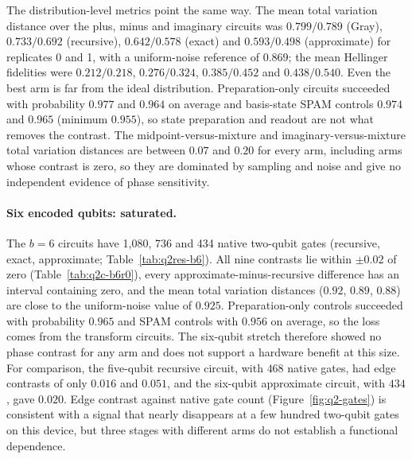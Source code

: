 \documentclass[11pt]{article}
\begin{document}
The distribution-level metrics point the same way. The mean total variation distance over the plus, minus and imaginary circuits was $0.799/0.789$ (Gray), $0.733/0.692$ (recursive), $0.642/0.578$ (exact) and $0.593/0.498$ (approximate) for replicates 0 and 1, with a uniform-noise reference of $0.869$; the mean Hellinger fidelities were $0.212/0.218$, $0.276/0.324$, $0.385/0.452$ and $0.438/0.540$. Even the best arm is far from the ideal distribution. Preparation-only circuits succeeded with probability $0.977$ and $0.964$ on average and basis-state SPAM controls $0.974$ and $0.965$ (minimum $0.955$), so state preparation and readout are not what removes the contrast. The midpoint-versus-mixture and imaginary-versus-mixture total variation distances are between $0.07$ and $0.20$ for every arm, including arms whose contrast is zero, so they are dominated by sampling and noise and give no independent evidence of phase sensitivity.

\paragraph{Six encoded qubits: saturated.} The $b=6$ circuits have 1,080, 736 and 434 native two-qubit gates (recursive, exact, approximate; Table~\ref{tab:q2res-b6}). All nine contrasts lie within $\pm0.02$ of zero (Table~\ref{tab:q2c-b6r0}), every approximate-minus-recursive difference has an interval containing zero, and the mean total variation distances ($0.92$, $0.89$, $0.88$) are close to the uniform-noise value of $0.925$. Preparation-only controls succeeded with probability $0.965$ and SPAM controls with $0.956$ on average, so the loss comes from the transform circuits. The six-qubit stretch therefore showed no phase contrast for any arm and does not support a hardware benefit at this size. For comparison, the five-qubit recursive circuit, with $468$ native gates, had edge contrasts of only $0.016$ and $0.051$, and the six-qubit approximate circuit, with $434$, gave $0.020$. Edge contrast against native gate count (Figure~\ref{fig:q2-gates}) is consistent with a signal that nearly disappears at a few hundred two-qubit gates on this device, but three stages with different arms do not establish a functional dependence.
\end{document}
